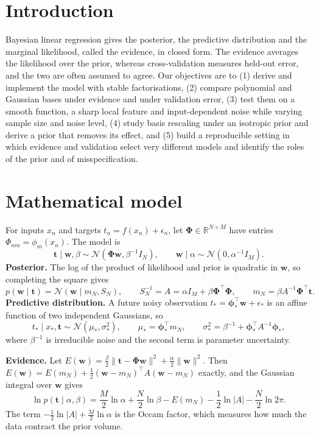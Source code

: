 \documentclass[10pt,a4paper]{article}
\newcommand{\bphi}{\bm{\phi}}
\newcommand{\bPhi}{\bm{\Phi}}
\newcommand{\bw}{\bm{w}}
\newcommand{\bt}{\bm{t}}
\begin{document}
\section{Introduction}
Bayesian linear regression gives the posterior, the predictive distribution and the marginal likelihood, called the evidence, in closed form. The evidence averages the likelihood over the prior, whereas cross-validation measures held-out error, and the two are often assumed to agree. Our objectives are to (1) derive and implement the model with stable factorisations, (2) compare polynomial and Gaussian bases under evidence and under validation error, (3) test them on a smooth function, a sharp local feature and input-dependent noise while varying sample size and noise level, (4) study basis rescaling under an isotropic prior and derive a prior that removes its effect, and (5) build a reproducible setting in which evidence and validation select very different models and identify the roles of the prior and of misspecification.

\section{Mathematical model}
For inputs $x_n$ and targets $t_n=f(x_n)+\epsilon_n$, let $\bPhi\in\mathbb{R}^{N\times M}$ have entries $\Phi_{nm}=\phi_m(x_n)$. The model is
\begin{equation}
\bt\mid\bw,\beta\sim\mathcal{N}(\bPhi\bw,\beta^{-1}I_N),\qquad \bw\mid\alpha\sim\mathcal{N}(0,\alpha^{-1}I_M).
\label{eq:model}
\end{equation}
\textbf{Posterior.} The log of the product of likelihood and prior is quadratic in $\bw$, so completing the square gives
\begin{equation}
p(\bw\mid\bt)=\mathcal{N}(\bw\mid m_N,S_N),\qquad S_N^{-1}=A=\alpha I_M+\beta\bPhi^\top\bPhi,\qquad m_N=\beta A^{-1}\bPhi^\top\bt .
\label{eq:post}
\end{equation}
\textbf{Predictive distribution.} A future noisy observation $t_*=\bphi_*^\top\bw+\epsilon_*$ is an affine function of two independent Gaussians, so
\begin{equation}
t_*\mid x_*,\bt\sim\mathcal{N}(\mu_*,\sigma_*^2),\qquad \mu_*=\bphi_*^\top m_N,\qquad \sigma_*^2=\beta^{-1}+\bphi_*^\top A^{-1}\bphi_* ,
\label{eq:pred}
\end{equation}
where $\beta^{-1}$ is irreducible noise and the second term is parameter uncertainty.

\textbf{Evidence.} Let $E(\bw)=\frac{\beta}{2}\|\bt-\bPhi\bw\|^2+\frac{\alpha}{2}\|\bw\|^2$. Then $E(\bw)=E(m_N)+\frac12(\bw-m_N)^\top A(\bw-m_N)$ exactly, and the Gaussian integral over $\bw$ gives
\begin{equation}
\ln p(\bt\mid\alpha,\beta)=\frac{M}{2}\ln\alpha+\frac{N}{2}\ln\beta-E(m_N)-\frac12\ln|A|-\frac{N}{2}\ln 2\pi .
\label{eq:evidence}
\end{equation}
The term $-\frac12\ln|A|+\frac M2\ln\alpha$ is the Occam factor, which measures how much the data contract the prior volume.
\end{document}

